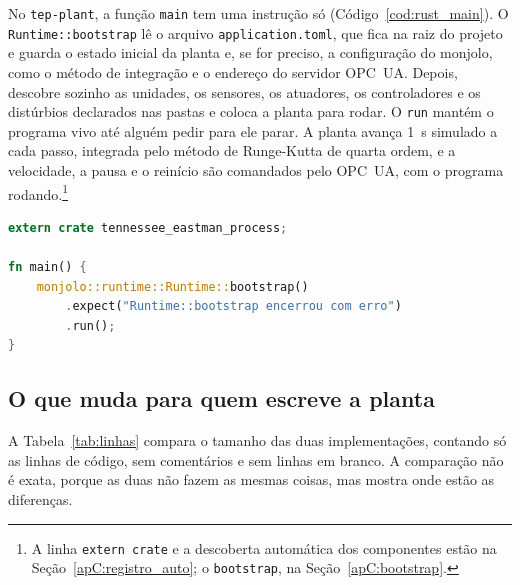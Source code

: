 No \texttt{tep-plant}, a função \texttt{main} tem uma instrução só (Código~\ref{cod:rust_main}). O \texttt{Runtime::bootstrap} lê o arquivo \texttt{application.toml}, que fica na raiz do projeto e guarda o estado inicial da planta e, se for preciso, a configuração do monjolo, como o método de integração e o endereço do servidor OPC~UA. Depois, descobre sozinho as unidades, os sensores, os atuadores, os controladores e os distúrbios declarados nas pastas e coloca a planta para rodar. O \texttt{run} mantém o programa vivo até alguém pedir para ele parar. A planta avança 1~s simulado a cada passo, integrada pelo método de Runge-Kutta de quarta ordem, e a velocidade, a pausa e o reinício são comandados pelo OPC~UA, com o programa rodando.\footnote{A linha \texttt{extern crate} e a descoberta automática dos componentes estão na Seção~\ref{apC:registro_auto}; o \texttt{bootstrap}, na Seção~\ref{apC:bootstrap}.}

\noindent\begin{minipage}{\linewidth}
\begin{lstlisting}[language=Rust, caption={A função \texttt{main} do \texttt{tep-plant}}, label={cod:rust_main}]
extern crate tennessee_eastman_process;

fn main() {
    monjolo::runtime::Runtime::bootstrap()
        .expect("Runtime::bootstrap encerrou com erro")
        .run();
}
\end{lstlisting}
\end{minipage}

\subsection{O que muda para quem escreve a planta}
\label{subsec:comparacao_fortran}

A Tabela~\ref{tab:linhas} compara o tamanho das duas implementações, contando só as linhas de código, sem comentários e sem linhas em branco. A comparação não é exata, porque as duas não fazem as mesmas coisas, mas mostra onde estão as diferenças.

